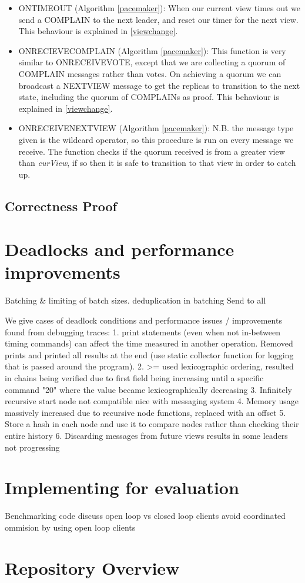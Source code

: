 \begin{itemize}
	\item ON{\large T}IMEOUT (Algorithm \ref{pacemaker}): When our current view times out we send a COMPLAIN to the next leader, and reset our timer for the next view. This behaviour is explained in \ref{viewchange}.
	\item ON{\large R}ECIEVE{\large C}OMPLAIN (Algorithm \ref{pacemaker}): This function is very similar to ON{\large R}ECEIVE{\large V}OTE, except that we are collecting a quorum of COMPLAIN messages rather than votes. On achieving a quorum we can broadcast a NEXT{\large V}IEW message to get the replicas to transition to the next state, including the quorum of COMPLAINs as proof. This behaviour is explained in \ref{viewchange}.
	\item ON{\large R}ECEIVE{\large N}EXT{\large V}IEW (Algorithm \ref{pacemaker}): N.B. the message type given is the wildcard operator, so this procedure is run on every message we receive. The function checks if the quorum received is from a greater view than \textit{curView}, if so then it is safe to transition to that view in order to catch up.
\end{itemize}

\subsection{Correctness Proof}

\section{Deadlocks and performance improvements} \label{deadlock}
Batching \& limiting of batch sizes. deduplication in batching
Send to all

We give cases of deadlock conditions
and performance issues / improvements found from debugging traces:
1. print statements (even when not in-between timing commands) can affect the time measured in another operation. Removed prints and printed all results at the end (use static collector function for logging that is passed around the program).
2. >= used lexicographic ordering, resulted in chains being verified due to first field being increasing until a specific command "20" where the value became lexicographically decreasing
3. Infinitely recursive start node not compatible nice with messaging system
4. Memory usage massively increased due to recursive node functions, replaced with an offset
5. Store a hash in each node and use it to compare nodes rather than checking their entire history
6. Discarding messages from future views results in some leaders not progressing
\section{Implementing for evaluation} \label{benchcode}
Benchmarking code
discuss open loop vs closed loop clients
avoid coordinated ommision by using open loop clients
\section{Repository Overview}